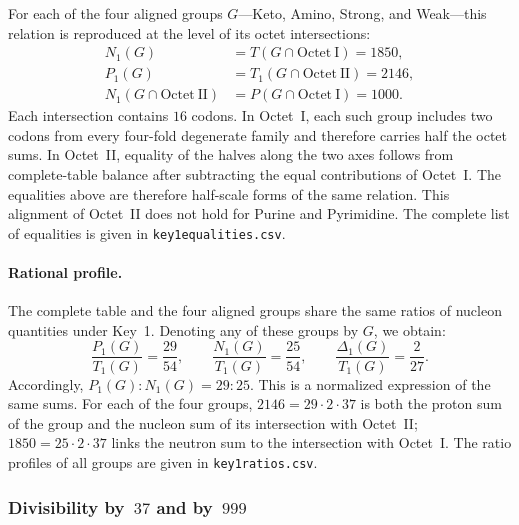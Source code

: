 \documentclass[11pt,a4paper]{article}
\renewcommand{\_}{\origunderscore\allowbreak}
\begin{document}
For each of the four aligned groups $G$---Keto, Amino,
Strong, and Weak---this relation is reproduced at the
level of its octet intersections:
\[
\begin{aligned}
N_1(G)&=T(G\cap\mathrm{Octet~I})=1850,\\
P_1(G)&=T_1(G\cap\mathrm{Octet~II})=2146,\\
N_1(G\cap\mathrm{Octet~II})
&=P(G\cap\mathrm{Octet~I})=1000.
\end{aligned}
\]
Each intersection contains $16$ codons. In Octet~I,
each such group includes two codons from every four-fold
degenerate family and therefore carries half the octet
sums. In Octet~II, equality of the halves along the two
axes follows from complete-table balance after subtracting
the equal contributions of Octet~I. The equalities above
are therefore half-scale forms of the same relation.
This alignment of Octet~II does not hold for Purine and
Pyrimidine. The complete list of equalities is given in
\texttt{key1\_equalities.csv}.

\paragraph{Rational profile.}
The complete table and the four aligned groups share
the same ratios of nucleon quantities under Key~1.
Denoting any of these groups by $G$, we obtain:
\[
\frac{P_1(G)}{T_1(G)}=\frac{29}{54},\qquad
\frac{N_1(G)}{T_1(G)}=\frac{25}{54},\qquad
\frac{\Delta_1(G)}{T_1(G)}=\frac{2}{27}.
\]
Accordingly, $P_1(G):N_1(G)=29:25$.
This is a normalized expression of the same sums. For
each of the four groups, $2146=29\cdot2\cdot37$ is both
the proton sum of the group and the nucleon sum of its
intersection with Octet~II; $1850=25\cdot2\cdot37$
links the neutron sum to the intersection with Octet~I.
The ratio profiles of all groups are given in
\texttt{key1\_ratios.csv}.

\subsubsection{Divisibility by~\texorpdfstring{$37$}{37} and by~\texorpdfstring{$999$}{999}}
\label{sec:results-key1-divisibility37and999}
\end{document}
